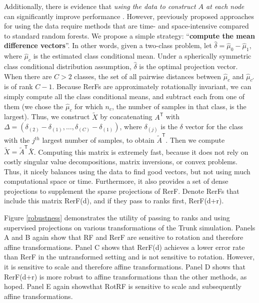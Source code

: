 \documentclass{article}
\providecommand{\mt}[1]{\widetilde{#1}}
\providecommand{\mh}[1]{\hat{#1}}
\newcommand{\T}{^{\ensuremath{\mathsf{T}}}}           %
\begin{document}
Additionally, there is evidence that {\em{using the data to construct $A$ at each node}} can significantly improve performance \cite{Heath1993}. However, previously proposed approaches for using the data require methods that are time- and space-intensive compared to standard random forests.  We propose a simple strategy: ``{\bf{compute the mean difference vectors}}''. In other words, given a two-class problem, let $\mh{\delta}=\mh{\mu}_0-\mh{\mu}_1$, where $\mh{\mu}_c$ is the estimated class conditional mean. Under a spherically symmetric class conditional distribution assumption, $\mh{\delta}$ is the optimal projection vector. When there are $C>2$ classes, the set of all pairwise distances between $\mh{\mu}_c$ and $\mh{\mu}_{c'}$ is of rank $C-1$. Because RerFs are approximately rotationally invariant, we can simply compute all the class conditional means, and subtract each from one of them (we chose the $\mh{\mu}_c$ for which $n_c$, the number of samples in that class, is the largest). Thus, we construct $\mt{X}$ by concatenating $A\T$ with $\Delta=(\delta_{(2)} - \delta_{(1)}, \ldots, \delta_{(C)} - \delta_{(1)})$, where $\delta_{(j)}$ is the $\delta$ vector for the class with the $j^{th}$ largest number of samples, to obtain $\mt{A}\T$. Then we compute $\mt{X} = \mt{A}\T\bar{X}$. Computing this matrix is extremely fast, because it does not rely on costly singular value decompositions, matrix inversions, or convex problems. Thus, it nicely balances using the data to find good vectors, but not using much computational space or time. Furthermore, it also provides a set of dense projections to supplement the sparse projections of RerF. Denote RerFs that include this matrix RerF(d), and if they pass to ranks first, RerF(d+r). 


Figure \ref{robustness} demonstrates the utility of passing to ranks and using supervised projections on various transformations of the Trunk simulation. Panels A and B again show that RF and RerF are sensitive to rotation and therefore affine transformations. Panel C shows that RerF(d) achieves a lower error rate than RerF in the untransformed setting and is not sensitive to rotation. However, it is sensitive to scale and therefore affine transformations. Panel D shows that RerF(d+r) is more robust to affine transformations than the other methods, as hoped. Panel E again showsthat RotRF is sensitive to scale and subsequently affine transformations.
\end{document}
